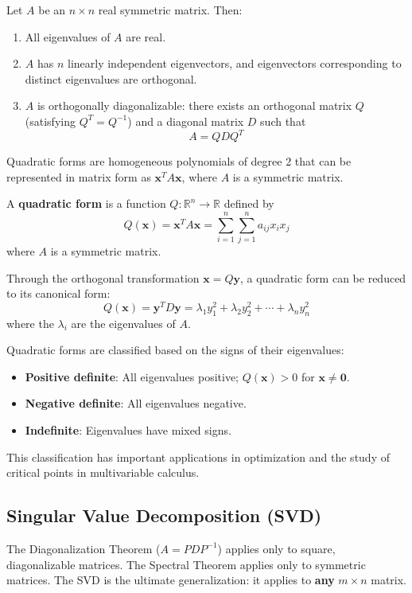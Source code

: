 \begin{theorem}
Let $A$ be an $n \times n$ real symmetric matrix. Then:
\begin{enumerate}
    \item All eigenvalues of $A$ are real.
    \item $A$ has $n$ linearly independent eigenvectors, and eigenvectors corresponding to distinct eigenvalues are orthogonal.
    \item $A$ is orthogonally diagonalizable: there exists an orthogonal matrix $Q$ (satisfying $Q^T = Q^{-1}$) and a diagonal matrix $D$ such that
    \[
    A = QDQ^T
    \]
\end{enumerate}
\end{theorem}

Quadratic forms are homogeneous polynomials of degree 2 that can be represented in matrix form as $\mathbf{x}^T A \mathbf{x}$, where $A$ is a symmetric matrix.

\begin{definition}
A \textbf{quadratic form} is a function $Q: \mathbb{R}^n \to \mathbb{R}$ defined by
\[
Q(\mathbf{x}) = \mathbf{x}^T A \mathbf{x} = \sum_{i=1}^n \sum_{j=1}^n a_{ij} x_i x_j
\]
where $A$ is a symmetric matrix.
\end{definition}

Through the orthogonal transformation $\mathbf{x} = Q\mathbf{y}$, a quadratic form can be reduced to its canonical form:
\[
Q(\mathbf{x}) = \mathbf{y}^T D \mathbf{y} = \lambda_1 y_1^2 + \lambda_2 y_2^2 + \cdots + \lambda_n y_n^2
\]
where the $\lambda_i$ are the eigenvalues of $A$.

Quadratic forms are classified based on the signs of their eigenvalues:
\begin{itemize}
    \item \textbf{Positive definite}: All eigenvalues positive; $Q(\mathbf{x}) > 0$ for $\mathbf{x} \neq \mathbf{0}$.
    \item \textbf{Negative definite}: All eigenvalues negative.
    \item \textbf{Indefinite}: Eigenvalues have mixed signs.
\end{itemize}

This classification has important applications in optimization and the study of critical points in multivariable calculus.

\newpage

\subsection{Singular Value Decomposition (SVD)}
The Diagonalization Theorem ($A = PDP^{-1}$) applies only to square, diagonalizable matrices. The Spectral Theorem applies only to symmetric matrices. The SVD is the ultimate generalization: it applies to \textbf{any} $m \times n$ matrix.


